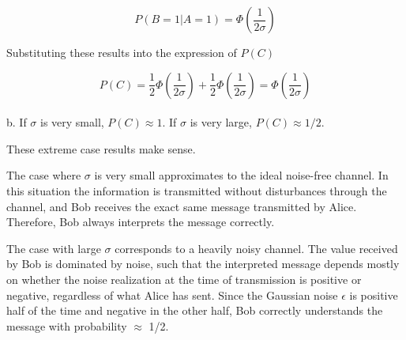 $$
P(B=1 | A=1) = \Phi \left( \frac{1}{2\sigma} \right)
$$

Substituting these results into the expression of $P(C)$

$$
P(C) = \frac{1}{2} \Phi \left( \frac{1}{2\sigma} \right) + \frac{1}{2} \Phi \left( \frac{1}{2\sigma} \right) = \Phi \left( \frac{1}{2\sigma} \right)
$$\\

b. If $\sigma$ is very small, $P(C) \approx 1$. If $\sigma$ is very large, $P(C) \approx 1/2$.

These extreme case results make sense.

The case where $\sigma$ is very small approximates to the ideal noise-free channel. In this situation the information is transmitted without disturbances through the channel, and Bob receives the exact same message transmitted by Alice. Therefore, Bob always interprets the message correctly.

The case with large $\sigma$ corresponds to a heavily noisy channel.
The value received by Bob is dominated by noise, such that the interpreted message depends mostly on whether the noise realization at the time of transmission is positive or negative, regardless of what Alice has sent. Since the Gaussian noise $\epsilon$ is positive half of the time and negative in the other half, Bob correctly understands the message with probability $\approx$ 1/2.
